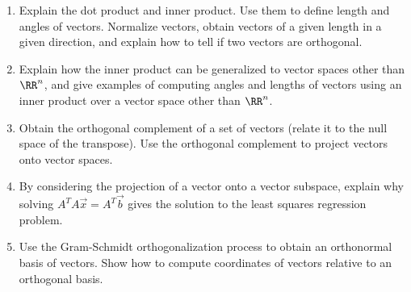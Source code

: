 
\begin{enumerate}

\item Explain the dot product and inner product. Use them to define length and angles of vectors. Normalize vectors, obtain vectors of a given length in a given direction, and explain how to tell if two vectors are orthogonal. 

\item Explain how the inner product can be generalized to vector spaces other than $\RR^n$, and give examples of computing angles and lengths of vectors using an inner product over a vector space other than $\RR^n$.

\item Obtain the orthogonal complement of a set of vectors (relate it to the null space of the transpose). Use the orthogonal complement to project vectors onto vector spaces. 

\item By considering the projection of a vector onto a vector subspace, explain why solving $A^TA \vec x = A^T\vec b$ gives the solution to the least squares regression problem.

\item Use the Gram-Schmidt orthogonalization process to obtain an orthonormal basis of vectors. Show how to compute coordinates of vectors relative to an orthogonal basis.


\end{enumerate}
